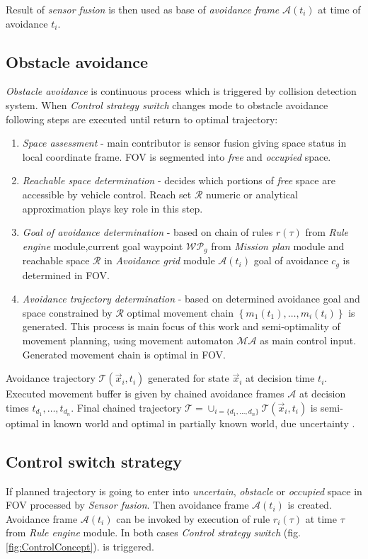 \noindent Result of \textit{sensor fusion} is then used as base of \textit{avoidance frame} $\mathscr{A}(t_i)$ at time of avoidance $t_i$.

\subsection*{Obstacle avoidance}
\noindent \textit{Obstacle avoidance} is continuous process which is triggered by collision detection system. When \textit{Control strategy switch} changes mode to obstacle avoidance following steps are executed until return to optimal trajectory:
\begin{enumerate}
    \item \textit{Space assessment} - main contributor is sensor fusion giving space status in local coordinate frame. FOV is segmented into \textit{free} and \textit{occupied} space. 
    \item \textit{Reachable space determination} - decides which portions of \textit{free} space are accessible by vehicle control. Reach set $\mathscr{R}$ numeric or analytical approximation plays key role in this step.
    \item \textit{Goal of avoidance determination} - based on chain of rules $r(\tau)$ from \textit{Rule engine} module,current goal waypoint $\mathscr{WP}_g$ from \textit{Mission plan} module and reachable space $\mathscr{R}$ in \textit{Avoidance grid} module $\mathscr{A}(t_i)$ goal of avoidance $c_g$ is determined in FOV. 
    \item \textit{Avoidance trajectory determination} - based on determined avoidance goal and space constrained by $\mathscr{R}$ optimal movement chain $\left\{m_1(t_1),\dots,m_i(t_i)\right\}$ is generated. This process is main focus of this work and semi-optimality of movement planning, using movement automaton $\mathscr{MA}$ as main control input. Generated movement chain is optimal in FOV.
\end{enumerate}

\noindent Avoidance trajectory $\mathscr{T}(\vec{x}_i,t_i)$ generated for state $\vec{x}_i$ at decision time $t_i$. Executed movement buffer is given by chained avoidance frames $\mathscr{A}$ at decision times $t_{d_1},\dots,t_{d_n}$. Final chained trajectory $\mathscr{T}= \cup_{i=\{d_1,\dots,d_n\}} \mathscr{T}(\vec{x}_{i},t_i)$ is semi-optimal in known world and optimal in partially known world, due uncertainty \cite{kochenderfer2008encounter}.

\newpage\subsection*{Control switch strategy}
\noindent If planned trajectory is going to enter into \textit{uncertain}, \textit{obstacle} or \textit{occupied} space in FOV processed by \textit{Sensor fusion}. Then avoidance frame $\mathscr{A}(t_i)$ is created. Avoidance frame $\mathscr{A}(t_i)$ can be invoked by execution of rule $r_i(\tau)$ at time $\tau$ from \textit{Rule engine} module. In both cases \textit{Control strategy switch} (fig. \ref{fig:ControlConcept}). is triggered. 

